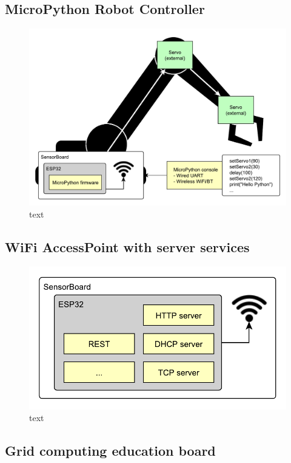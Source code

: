 \subsection{MicroPython Robot Controller}

\begin{figure}[H]
	\centering
	\label{UELogging1}
	\caption{text}
	\includegraphics[width=16cm]{img/UsageExamplesPythonRobot.pdf}
\end{figure}

\subsection{WiFi AccessPoint with server services}

\begin{figure}[H]
	\centering
	\label{UELogging1}
	\caption{text}
	\includegraphics[scale=1]{img/UsageExamplesServer.pdf}
\end{figure}

\subsection{Grid computing education board}

